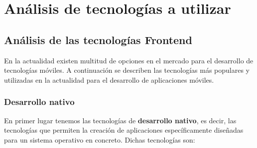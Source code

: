 \chapter{Análisis de tecnologías a utilizar}
\label{cap:analisis_tecnologias}

\section{Análisis de las tecnologías Frontend}
\label{sec:frontend}
En la actualidad existen multitud de opciones en el mercado para el desarrollo de tecnologías móviles. A continuación se describen las tecnologías más populares y utilizadas en la actualidad para el desarrollo de aplicaciones móviles.

\subsection{Desarrollo nativo}
\label{subsec:nativo}
En primer lugar tenemos las tecnologías de \textbf{desarrollo nativo}, es decir, las tecnologías que permiten la creación de aplicaciones específicamente diseñadas
para un sistema operativo en concreto. Dichas tecnologías son: 

